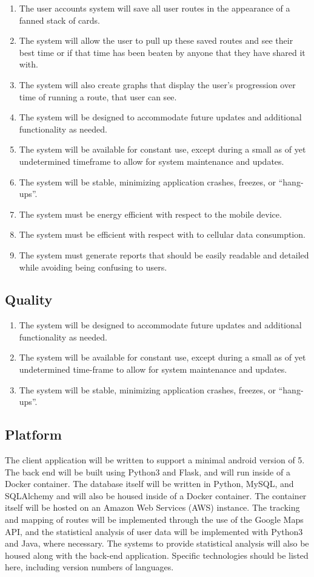 ﻿\documentclass{article}
\begin{document}
\begin{enumerate}
    \item The user accounts system will save all user routes in the appearance of a fanned stack of cards.
    \item The system will allow the user to pull up these saved routes and see their best time or if that time has been beaten by anyone that they have shared it with.
    \item The system will also create graphs that display the user’s progression over time of running a route, that user can see.
    \item The system will be designed to accommodate future updates and additional functionality as needed.
    \item The system will be available for constant use, except during a small as of yet undetermined timeframe to allow for system maintenance and updates.
    \item The system will be stable, minimizing application crashes, freezes, or “hang-ups”.
    \item The system must be energy efficient with respect to the mobile device.
    \item The system must be efficient with respect with to cellular data consumption.
    \item The system must generate reports that should be easily readable and detailed while avoiding being confusing to users.
    
    
    

\end{enumerate}
\subsection{Quality}
\begin{enumerate}
    \item The system will be designed to accommodate future updates and additional functionality as needed.
    \item The system will be available for constant use, except during a small as of yet undetermined time-frame to allow for system maintenance and updates.
    \item The system will be stable, minimizing application crashes, freezes, or “hang-ups”.
\end{enumerate}
\subsection{Platform}
The client application will be written to support a minimal android version of 5. The back end will be built using Python3 and Flask, and will run inside of a Docker container. The database itself will be written in Python, MySQL, and SQLAlchemy and will also be housed inside of a Docker container. The container itself will be hosted on an Amazon Web Services (AWS) instance. The tracking and mapping of routes will be implemented through the use of the Google Maps API, and the statistical analysis of user data will be implemented with Python3 and Java, where necessary. The systems to provide statistical analysis will also be housed along with the back-end application.
Specific technologies should be listed here, including version numbers of languages.
\end{document}
